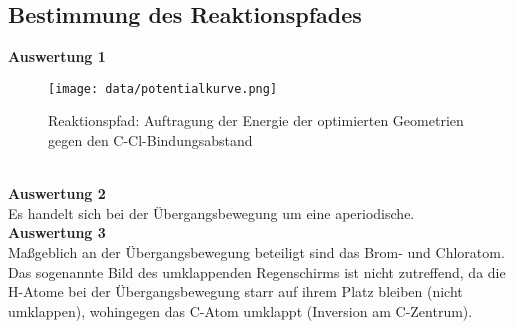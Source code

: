 \documentclass[12pt]{article}
\begin{document}
\begin{onehalfspace}
\subsection{Bestimmung des Reaktionspfades}
\textbf{Auswertung 1}
\begin{figure}[!htpb]
\centering
  \texttt{[image: data/potentialkurve.png]}%
      \captionsetup{justification=raggedright}
  \caption{Reaktionspfad: Auftragung der Energie der optimierten Geometrien gegen den C-Cl-Bindungsabstand}
\end{figure}\\
\noindent
\textbf{Auswertung 2}\\
Es handelt sich bei der Übergangsbewegung um eine aperiodische. \\
\noindent
\textbf{Auswertung 3}\\
Maßgeblich an der Übergangsbewegung beteiligt sind das Brom- und Chloratom.
 Das sogenannte Bild des \glqq umklappenden Regenschirms \grqq ist nicht zutreffend, da die H-Atome bei der Übergangsbewegung starr auf ihrem Platz bleiben (nicht umklappen), wohingegen das C-Atom umklappt (Inversion am C-Zentrum).
\end{onehalfspace}
\end{document}
